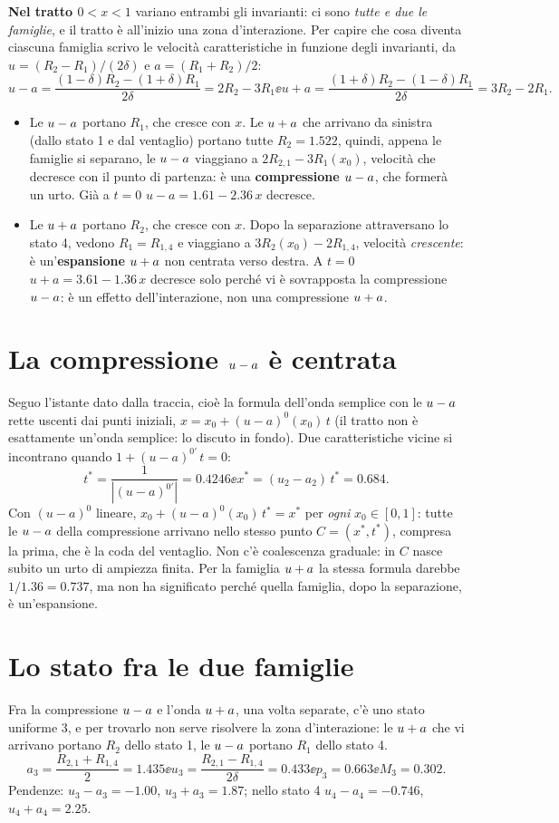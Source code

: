 \textbf{Nel tratto $0<x<1$} variano entrambi gli invarianti: ci sono \emph{tutte e due le famiglie}, e il tratto è
all'inizio una zona d'interazione. Per capire che cosa diventa ciascuna famiglia scrivo le velocità caratteristiche
in funzione degli invarianti, da $u=(R_2-R_1)/(2\delta)$ e $a=(R_1+R_2)/2$:
\[
u-a=\frac{(1-\delta)R_2-(1+\delta)R_1}{2\delta}=2R_2-3R_1\ee
u+a=\frac{(1+\delta)R_2-(1-\delta)R_1}{2\delta}=3R_2-2R_1 .
\]
\begin{itemize}
\item Le $u-a$ portano $R_1$, che cresce con $x$. Le $u+a$ che arrivano da sinistra (dallo stato 1 e dal
  ventaglio) portano tutte $R_2=\num{1.522}$, quindi, appena le famiglie si separano, le $u-a$ viaggiano a
  $2R_{2,1}-3R_1(x_0)$, velocità che decresce con il punto di partenza: è una \textbf{compressione $u-a$}, che
  formerà un urto. Già a $t=0$ $u-a=\num{1.61}-\num{2.36}\,x$ decresce.
\item Le $u+a$ portano $R_2$, che cresce con $x$. Dopo la separazione attraversano lo stato 4, vedono
  $R_1=R_{1,4}$ e viaggiano a $3R_2(x_0)-2R_{1,4}$, velocità \emph{crescente}: è un'\textbf{espansione $u+a$} non
  centrata verso destra. A $t=0$ $u+a=\num{3.61}-\num{1.36}\,x$ decresce solo perché vi è sovrapposta la
  compressione $u-a$: è un effetto dell'interazione, non una compressione $u+a$.
\end{itemize}

\section*{La compressione $u-a$ è centrata}
Seguo l'istante dato dalla traccia, cioè la formula dell'onda semplice con le $u-a$ rette uscenti dai punti
iniziali, $x=x_0+(u-a)^0(x_0)\,t$ (il tratto non è esattamente un'onda semplice: lo discuto in fondo). Due
caratteristiche vicine si incontrano quando $1+(u-a)^{0\prime}\,t=0$:
\[
t^*=\frac{1}{|(u-a)^{0\prime}|}=\num{0.4246}\ee x^*=(u_2-a_2)\,t^*=\num{0.684}.
\]
Con $(u-a)^0$ lineare, $x_0+(u-a)^0(x_0)\,t^*=x^*$ per \emph{ogni} $x_0\in[0,1]$: tutte le $u-a$ della
compressione arrivano nello stesso punto $C=(x^*,t^*)$, compresa la prima, che è la coda del ventaglio. Non c'è
coalescenza graduale: in $C$ nasce subito un urto di ampiezza finita. Per la famiglia $u+a$ la stessa formula
darebbe $1/\num{1.36}=\num{0.737}$, ma non ha significato perché quella famiglia, dopo la separazione, è
un'espansione.

\section*{Lo stato fra le due famiglie}
Fra la compressione $u-a$ e l'onda $u+a$, una volta separate, c'è uno stato uniforme 3, e per trovarlo non serve
risolvere la zona d'interazione: le $u+a$ che vi arrivano portano $R_2$ dello stato 1, le $u-a$ portano $R_1$
dello stato 4.
\[
a_3=\frac{R_{2,1}+R_{1,4}}{2}=\num{1.435}\ee u_3=\frac{R_{2,1}-R_{1,4}}{2\delta}=\num{0.433}\ee
p_3=\num{0.663}\ee M_3=\num{0.302}.
\]
Pendenze: $u_3-a_3=-\num{1.00}$, $u_3+a_3=\num{1.87}$; nello stato 4 $u_4-a_4=-\num{0.746}$, $u_4+a_4=\num{2.25}$.

